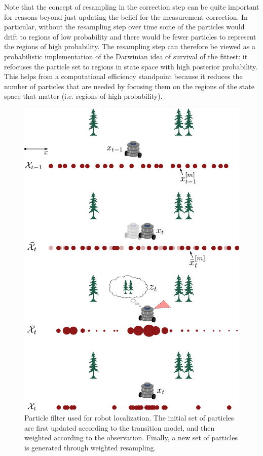 Note that the concept of resampling in the correction step can be quite important for reasons beyond just updating the belief for the measurement correction. In particular, without the resampling step over time some of the particles would drift to regions of low probability and there would be fewer particles to represent the regions of high probability. The resampling step can therefore be viewed as a probabilistic implementation of the Darwinian idea of survival of the fittest: it refocuses the particle set to regions in state space with high posterior probability. This helps from a computational efficiency standpoint because it reduces the number of particles that are needed by focusing them on the regions of the state space that matter (i.e. regions of high probability).
\begin{figure}[ht]
\centering
\includegraphics[width=0.8\linewidth]{tex/figs/ch16_figs/particlefilter.png}
\caption{Particle filter used for robot localization. The initial set of particles are first updated according to the transition model, and then weighted according to the observation. Finally, a new set of particles is generated through weighted resampling.}
\label{fig:Particle_filter}
\end{figure}


